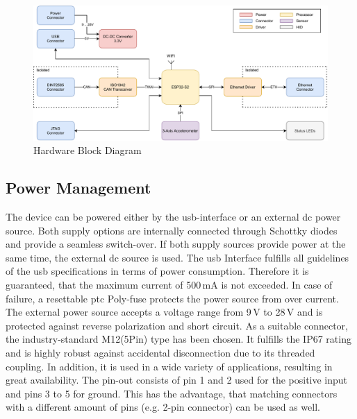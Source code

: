 \medskip
\begin{figure}[h!]
	\centering
	\includegraphics[width=\textwidth]{images/fleet_monitor_hardware}
	\vspace{0.1cm}
	\caption{Hardware Block Diagram}
	\label{fig:hardware-block-diagram}
\end{figure}

\subsection{Power Management}
The device can be powered either by the \acrshort{usb}-interface or an external \acrshort{dc} power source. Both supply options are internally connected through Schottky diodes and provide a seamless switch-over. If both supply sources provide power at the same time, the external \acrshort{dc} source is used.\newline
The \acrfull{usb} Interface fulfills all guidelines of the \acrshort{usb} specifications in terms of power consumption. Therefore it is guaranteed, that the maximum current of 500\,mA is not exceeded. In case of failure, a resettable \acrshort{ptc} Poly-fuse protects the power source from over current.\newline
The external power source accepts a voltage range from 9\,V to 28\,V and is protected against reverse polarization and short circuit. As a suitable connector, the industry-standard M12\;(5\;Pin) type has been chosen. It fulfills the IP67 rating and is highly robust against accidental disconnection due to its threaded coupling. In addition, it is used in a wide variety of applications, resulting in great availability. The pin-out consists of pin 1 and 2 used for the positive input and pins 3 to 5 for ground. This has the advantage, that matching connectors with a different amount of pins (e.g. 2-pin connector) can be used as well.

